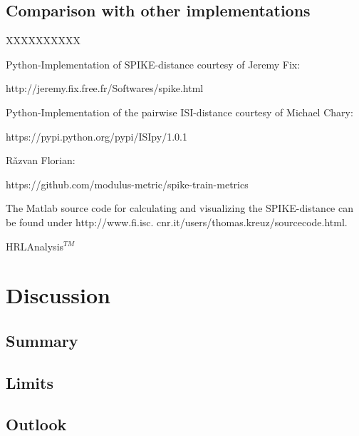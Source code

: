 \documentclass[10pt,twocolumn]{elsart5p}
\begin{document}
\subsection{\label{ss:Other-Implementations} Comparison with other implementations}


XXXXXXXXXX


Python-Implementation of SPIKE-distance courtesy of Jeremy Fix:

http://jeremy.fix.free.fr/Softwares/spike.html

Python-Implementation of the pairwise ISI-distance courtesy of Michael Chary:

https://pypi.python.org/pypi/ISIpy/1.0.1

R{\v a}zvan Florian:

https://github.com/modulus-metric/spike-train-metrics

\citep{Rusu14}

The Matlab source code for calculating and visualizing the SPIKE-distance can be found under http://www.fi.isc. cnr.it/users/thomas.kreuz/sourcecode.html.


HRLAnalysis$^{TM}$ \citep{Thibeault14}




\section{\label{s:Discussion} Discussion}

\subsection{\label{ss:Summary} Summary}

\subsection{\label{ss:Limits} Limits}

\subsection{\label{ss:Outlook} Outlook}


\begin{appendix} \label{Appendix}

\end{appendix}


\vspace{1cm}
\end{document}
